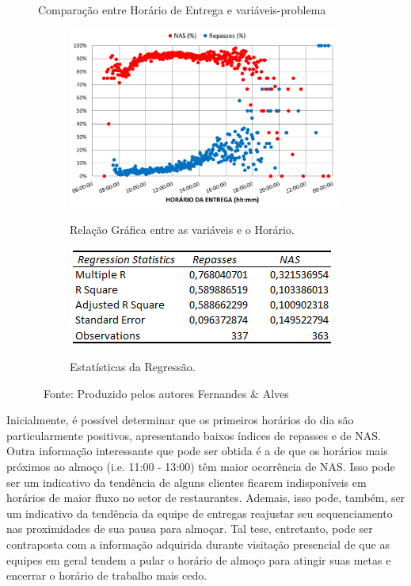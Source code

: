  \begin{figure}[H]
     \caption{Comparação entre Horário de Entrega e variáveis-problema}
     \begin{subfigure}{.64\textwidth}
         \centering
         \caption{Relação Gráfica entre as variáveis e o Horário.}
         \includegraphics[width=.98\linewidth]{images/5_emp_bebidas/excel_based/Horario.png}
         \label{fig:Horario}
     \end{subfigure}
     \begin{subfigure}{.35\textwidth}
       \centering
       \caption{Estatísticas da Regressão.}
       \includegraphics[width=.88\linewidth]{images/5_emp_bebidas/excel_based/Horario_RS.png}
       \label{fig:HorarioRS}
     \end{subfigure}
     \caption*{\ Fonte: Produzido pelos autores Fernandes \& Alves}
 \end{figure} %

Inicialmente, é possível determinar que os primeiros horários do dia são particularmente positivos, apresentando baixos índices de repasses e de NAS. 
Outra informação interessante que pode ser obtida é a de que os horários mais próximos ao almoço (i.e. 11:00 - 13:00) têm maior ocorrência de NAS.
Isso pode ser um indicativo da tendência de alguns clientes ficarem indisponíveis em horários de maior fluxo no setor de restaurantes.
Ademais, isso pode, também, ser um indicativo da tendência da equipe de entregas reajustar seu sequenciamento nas proximidades de sua pausa para almoçar. 
Tal tese, entretanto, pode ser contraposta com a informação adquirida durante visitação presencial de que as equipes em geral tendem a pular o horário de almoço para atingir suas metas e encerrar o horário de trabalho mais cedo.

